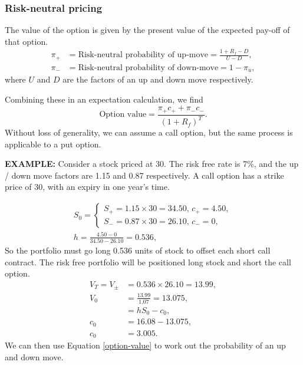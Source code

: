 \documentclass[../notes_compiled.tex]{subfiles}
\begin{document}
\subsubsection{Risk-neutral pricing}
\begin{itemize}
\item The value of the option is given by the present value of the expected pay-off of that option.
\begin{align}
\pi_{+}&=\text{Risk-neutral probability of up-move}=\frac{1+R_{f}-D}{U-D}, \label{pi-plus} \\
\pi_{-}&=\text{Risk-neutral probability of down-move}=1-\pi_{u}, \label{pi-minus}
\end{align}
where $U$ and $D$ are the factors of an up and down move respectively.
\item[] Combining these in an expectation calculation, we find
\begin{equation}
\text{Option value} = \frac{\pi_{+}c_{+} + \pi_{-}c_{-}}{(1+R_{f})^{T}}. \label{option-value}
\end{equation}
Without loss of generality, we can assume a call option, but the same process is applicable to a put option.
{\color{RedViolet}
\item[] \textbf{EXAMPLE:} Consider a stock priced at 30. The risk free rate is 7\%, and the up / down move factors are 1.15 and 0.87 respectively. A call option has a strike price of 30, with an expiry in one year’s time.
}
{\color{RoyalBlue}
\begin{align*}
S_{0}=\begin{cases}S_{+} = 1.15\times30=34.50\text{, }c_{+}=4.50, \\ S_{-} = 0.87\times30=26.10\text{, }c_{-}=0,\end{cases} \\
h=\frac{4.50-0}{34.50-26.10}=0.536,
\end{align*}
So the portfolio must go long 0.536 units of stock to offset each short call contract. The risk free portfolio will be positioned long stock and short the call option.
\begin{align*}
V_{T}=V_{\pm}&=0.536\times26.10=13.99 ,\\
V_{0}&=\frac{13.99}{1.07}=13.075, \\
&=hS_{0}-c_{0}, \\
c_{0}&=16.08-13.075, \\
c_{0}&=3.005.
\end{align*}
We can then use Equation \ref{option-value} to work out the probability of an up and down move.
}
\end{itemize}
\end{document}
